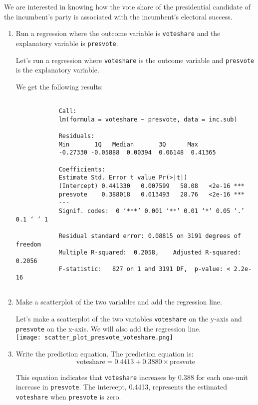 \documentclass[12pt,letterpaper]{article}
\begin{document}
\noindent We are interested in knowing how the vote share of the presidential candidate of the incumbent's party is associated with the incumbent's electoral success.
	\vspace{.25cm}
	\begin{enumerate}
		\item Run a regression where the outcome variable is \texttt{voteshare} and the explanatory variable is \texttt{presvote}.
		
		Let's run a regression where \texttt{voteshare} is the outcome variable and \texttt{presvote} is the explanatory variable.
		
		
		We get the following results:
		
		\begin{verbatim}
			
			Call:
			lm(formula = voteshare ~ presvote, data = inc.sub)
			
			Residuals:
			Min       1Q   Median       3Q      Max 
			-0.27330 -0.05888  0.00394  0.06148  0.41365 
			
			Coefficients:
			Estimate Std. Error t value Pr(>|t|)    
			(Intercept) 0.441330   0.007599   58.08   <2e-16 ***
			presvote    0.388018   0.013493   28.76   <2e-16 ***
			---
			Signif. codes:  0 ‘***’ 0.001 ‘**’ 0.01 ‘*’ 0.05 ‘.’ 0.1 ‘ ’ 1
			
			Residual standard error: 0.08815 on 3191 degrees of freedom
			Multiple R-squared:  0.2058,	Adjusted R-squared:  0.2056 
			F-statistic:   827 on 1 and 3191 DF,  p-value: < 2.2e-16
			
		\end{verbatim}
		
			
			\vspace{4cm}
		\item Make a scatterplot of the two variables and add the regression line. 
		
		Let's make a scatterplot of the two variables \texttt{voteshare} on the y-axis and \texttt{presvote} on the x-axis. We will also add the regression line. \\
		
		
		
		\texttt{[image: scatter\_plot\_presvote\_voteshare.png]}
		
		
			\vspace{2cm}
		\item Write the prediction equation.
		The prediction equation is:
		\[
		\text{voteshare} = 0.4413 + 0.3880 \times \text{presvote}
		\]
		
		This equation indicates that  \texttt{voteshare} increases by 0.388 for each one-unit increase in  \texttt{presvote}. The intercept, 0.4413, represents the estimated  \texttt{voteshare} when  \texttt{presvote} is zero.
		
	
		
		
	\end{enumerate}
	
\end{document}
